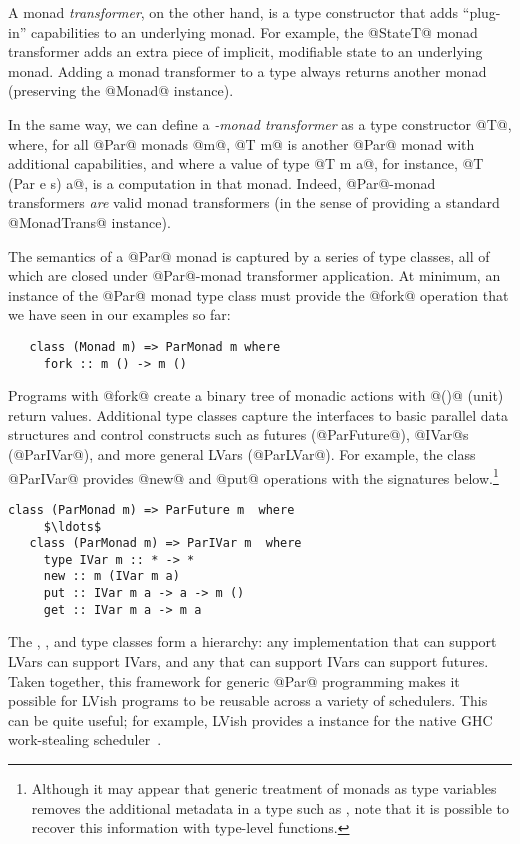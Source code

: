 A monad \emph{transformer}, on the other hand, is a type constructor
that adds ``plug-in'' capabilities to an underlying monad.  For
example, the @StateT@ monad transformer adds an extra piece of
implicit, modifiable state to an underlying monad.  Adding a monad
transformer to a type always returns another monad (preserving the
@Monad@ instance).

In the same way, we can define a \emph{-monad transformer} as
a type constructor @T@, where, for all @Par@ monads @m@, @T m@ is
another @Par@ monad with additional capabilities, and where a value of
type @T m a@, for instance, @T (Par e s) a@, is a computation in that
monad.  Indeed, @Par@-monad transformers \emph{are} valid monad
transformers (in the sense of providing a standard @MonadTrans@
instance).

The semantics of a @Par@ monad is captured by a series of type
classes, all of which are closed under @Par@-monad transformer
application.  At minimum, an instance of the @Par@ monad type class
must provide the @fork@ operation that we have seen in our examples so
far:

\singlespacing
\begin{lstlisting}
   class (Monad m) => ParMonad m where
     fork :: m () -> m ()
\end{lstlisting}
\doublespacing

Programs with @fork@ create a binary tree of monadic actions with @()@
(unit) return values.  Additional type classes capture the interfaces
to basic parallel data structures and control constructs such as
futures (@ParFuture@), @IVar@s (@ParIVar@), and more general LVars
(@ParLVar@). For example, the class @ParIVar@ provides @new@ and @put@
operations with the signatures below.\footnote{Although it may appear
  that generic treatment of  monads as type variables 
  removes the additional metadata in a type such as ,
  note that it is possible to recover this information with type-level
  functions.}

\singlespacing
\begin{lstlisting}[mathescape=true]
   class (ParMonad m) => ParFuture m  where
     $\ldots$ 
   class (ParMonad m) => ParIVar m  where
     type IVar m :: * -> *
     new :: m (IVar m a)
     put :: IVar m a -> a -> m ()
     get :: IVar m a -> m a
\end{lstlisting}
\doublespacing

The , , and  type classes form a
hierarchy: any implementation that can support LVars can support
IVars, and any that can support IVars can support futures.  Taken
together, this framework for generic @Par@ programming makes it
possible for LVish programs to be reusable across a variety of
schedulers.  This can be quite useful; for example, LVish provides a
 instance for the native GHC work-stealing
scheduler~\cite{runtime-support-multicore-haskell}.

